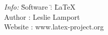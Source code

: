 \documentclass{article}
\begin{document}
\begin{tabbing}
  \emph{Info:} \= Software \= : \= \LaTeX \\
  \> Author    \> : \> Leslie Lamport \\
  \> Website   \> : \> www.latex-project.org
\end{tabbing}
\end{document}
